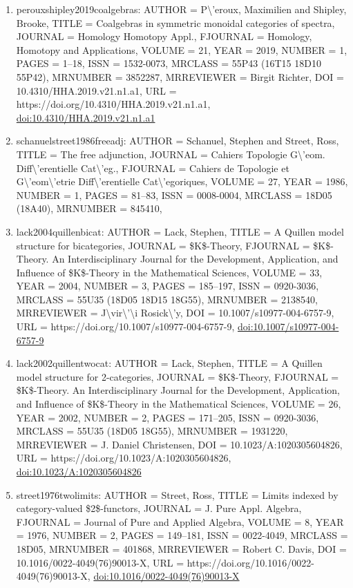 \documentclass[11pt]{article}
\begin{document}
\begin{enumerate}[leftmargin=*]
  \item perouxshipley2019coalgebras: AUTHOR = P\textbackslash{}'eroux, Maximilien and Shipley, Brooke, TITLE = Coalgebras in symmetric monoidal categories of spectra, JOURNAL = Homology Homotopy Appl., FJOURNAL = Homology, Homotopy and Applications, VOLUME = 21, YEAR = 2019, NUMBER = 1, PAGES = 1--18, ISSN = 1532-0073, MRCLASS = 55P43 (16T15 18D10 55P42), MRNUMBER = 3852287, MRREVIEWER = Birgit Richter, DOI = 10.4310/HHA.2019.v21.n1.a1, URL = https://doi.org/10.4310/HHA.2019.v21.n1.a1, \href{https://doi.org/10.4310/HHA.2019.v21.n1.a1}{doi:10.4310/HHA.2019.v21.n1.a1}
  \item schanuelstreet1986freeadj: AUTHOR = Schanuel, Stephen and Street, Ross, TITLE = The free adjunction, JOURNAL = Cahiers Topologie G\textbackslash{}'eom. Diff\textbackslash{}'erentielle Cat\textbackslash{}'eg., FJOURNAL = Cahiers de Topologie et G\textbackslash{}'eom\textbackslash{}'etrie Diff\textbackslash{}'erentielle Cat\textbackslash{}'egoriques, VOLUME = 27, YEAR = 1986, NUMBER = 1, PAGES = 81--83, ISSN = 0008-0004, MRCLASS = 18D05 (18A40), MRNUMBER = 845410,
  \item lack2004quillenbicat: AUTHOR = Lack, Stephen, TITLE = A Quillen model structure for bicategories, JOURNAL = \$K\$-Theory, FJOURNAL = \$K\$-Theory. An Interdisciplinary Journal for the Development, Application, and Influence of \$K\$-Theory in the Mathematical Sciences, VOLUME = 33, YEAR = 2004, NUMBER = 3, PAGES = 185--197, ISSN = 0920-3036, MRCLASS = 55U35 (18D05 18D15 18G55), MRNUMBER = 2138540, MRREVIEWER = J\textbackslash{}vir\textbackslash{}'\textbackslash{}i Rosick\textbackslash{}'y, DOI = 10.1007/s10977-004-6757-9, URL = https://doi.org/10.1007/s10977-004-6757-9, \href{https://doi.org/10.1007/s10977-004-6757-9}{doi:10.1007/s10977-004-6757-9}
  \item lack2002quillentwocat: AUTHOR = Lack, Stephen, TITLE = A Quillen model structure for 2-categories, JOURNAL = \$K\$-Theory, FJOURNAL = \$K\$-Theory. An Interdisciplinary Journal for the Development, Application, and Influence of \$K\$-Theory in the Mathematical Sciences, VOLUME = 26, YEAR = 2002, NUMBER = 2, PAGES = 171--205, ISSN = 0920-3036, MRCLASS = 55U35 (18D05 18G55), MRNUMBER = 1931220, MRREVIEWER = J. Daniel Christensen, DOI = 10.1023/A:1020305604826, URL = https://doi.org/10.1023/A:1020305604826, \href{https://doi.org/10.1023/A:1020305604826}{doi:10.1023/A:1020305604826}
  \item street1976twolimits: AUTHOR = Street, Ross, TITLE = Limits indexed by category-valued \$2\$-functors, JOURNAL = J. Pure Appl. Algebra, FJOURNAL = Journal of Pure and Applied Algebra, VOLUME = 8, YEAR = 1976, NUMBER = 2, PAGES = 149--181, ISSN = 0022-4049, MRCLASS = 18D05, MRNUMBER = 401868, MRREVIEWER = Robert C. Davis, DOI = 10.1016/0022-4049(76)90013-X, URL = https://doi.org/10.1016/0022-4049(76)90013-X, \href{https://doi.org/10.1016/0022-4049(76)90013-X}{doi:10.1016/0022-4049(76)90013-X}

\end{enumerate}
\end{document}
